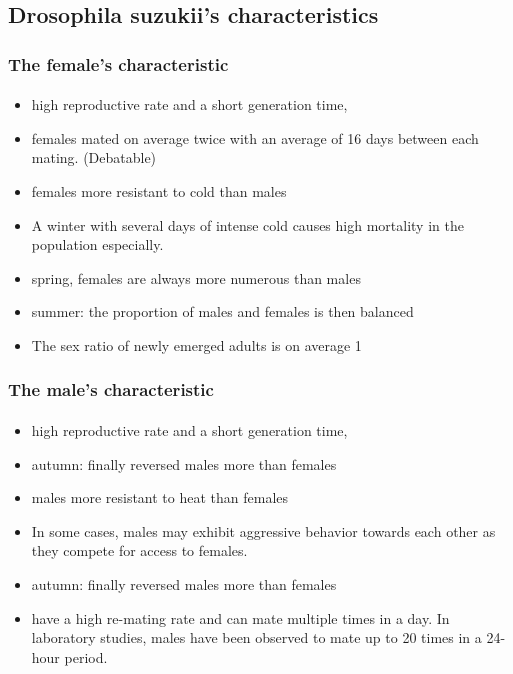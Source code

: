 \documentclass[light]{lutbeamer} %
\begin{document}
\subsection{Drosophila suzukii's characteristics}
\begin{frame}
\frametitle{The female's characteristic}
\framesubtitle{}
\begin{itemize}
\item high reproductive rate and a short generation time,
\item females mated on average twice with an average of 16 days between each mating. (Debatable)
\item females more resistant to cold than males
\item A winter with several days of intense cold causes high mortality in the population especially.
\item spring, females are always more numerous than males
\item summer: the proportion of males and females is then balanced 
\item The sex ratio of newly emerged adults is on average 1

\end{itemize}
\end{frame}

\begin{frame}
\frametitle{The male's characteristic}
\framesubtitle{}
\begin{itemize}
\item high reproductive rate and a short generation time,
\item autumn: finally reversed males more than females
\item males more resistant to heat than females
\item In some cases, males may exhibit aggressive behavior towards each other as they compete for access to females. 
\item autumn: finally reversed males more than females
\item have a high re-mating rate and can mate multiple times in a day. In laboratory studies, males have been observed to mate up to 20 times in a 24-hour period. 

\end{itemize}
\end{frame}
\end{document}
